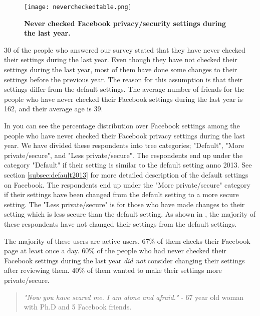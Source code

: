 \begin{figure}[b]
\centering
\texttt{[image: nevercheckedtable.png]}
\caption[Never checked Facebook privacy/security settings during the last year]{\textbf{Never checked Facebook privacy/security settings during the last year.}} 
\label{fig:neverchecked}
\end{figure}

30 of the people who answered our survey stated that they have never checked their settings during the last year. Even though they have not checked their  settings during the last year, most of them have done some changes to their settings before the previous year. The reason for this assumption is that their settings differ from the default settings.  
The average number of friends for the people who have never checked their Facebook settings during the last year is 162, and their average age is 39. 

In  you can see the percentage distribution over Facebook settings among the people who have never checked their Facebook privacy settings during the last year. We have divided these respondents into tree categories; "Default", "More private/secure", and "Less private/secure". The respondents end up under the category "Default" if their setting is similar to the default setting anno 2013. See section \ref{subsec:default2013} for more detailed description of the default settings on Facebook. The respondents end up under the "More private/secure" category if their settings have been changed from the default setting to a more secure setting. The "Less private/secure" is for those who have made changes to their setting which is less secure than the default setting. As shown in , the majority of these respondents have not changed their settings from the default settings. 

The majority of these users are active users, 67\% of them checks their Facebook page at least once a day. 60\% of the people who had never checked their Facebook settings during the last year \textit{did not} consider changing their settings after reviewing them. 40\% of them wanted to make their settings more private/secure. 

\begin{quote}
\textit{"Now you have scared me. I am alone and afraid."} - 67 year old woman with Ph.D and 5 Facebook friends. 
\end{quote}



